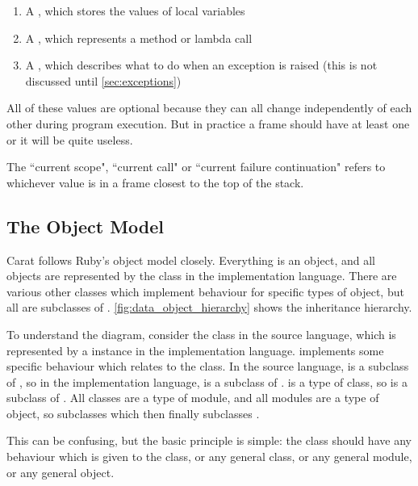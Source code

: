 \begin{enumerate}
  \item A , which stores the values of local variables
  \item A , which represents a method or lambda call
  \item A , which describes what to do when an exception is raised (this is not discussed until \autoref{sec:exceptions})
\end{enumerate}

All of these values are optional because they can all change independently of each other during program execution. But in practice a frame should have at least one or it will be quite useless.

The ``current scope", ``current call" or ``current failure continuation" refers to whichever value is in a frame closest to the top of the stack.

\subsection{The Object Model}
\label{sec:object_model}

Carat follows Ruby's object model closely. Everything is an object, and all objects are represented by the class  in the implementation language. There are various other classes which implement behaviour for specific types of object, but all are subclasses of . \autoref{fig:data_object_hierarchy} shows the inheritance hierarchy.

To understand the diagram, consider the class  in the source language, which is represented by a  instance in the implementation language.  implements some specific behaviour which relates to the  class. In the source language,  is a subclass of , so in the implementation language,  is a subclass of .  is a type of class, so  is a subclass of . All classes are a type of module, and all modules are a type of object, so  subclasses  which then finally subclasses .

This can be confusing, but the basic principle is simple: the  class should have any behaviour which is given to the  class, or any general class, or any general module, or any general object.

